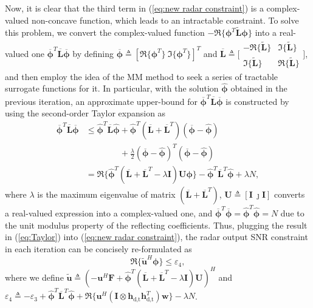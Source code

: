 \documentclass[Conference,a4paper]{IEEEtran}
\newcommand{\be}{\begin{equation}}
\newcommand{\ee}{\end{equation}}
\newcommand{\non}{\nonumber}
\begin{document}
Now, it is clear that the third term in (\ref{eq:new radar constraint}) is a complex-valued non-concave function, which leads to an intractable constraint.
To solve this problem, we convert the complex-valued function $-\Re\{\bm{\phi}^T\widetilde{\mathbf{L}}\bm{\phi}\}$ into a real-valued one $\overline{\bm{\phi}}^T\overline{\mathbf{L}}\overline{\bm{\phi}}$ by defining $\overline{\bm{\phi}} \triangleq [\Re\{\bm{\phi}^T\}~\Im\{\bm{\phi}^T\}]^T$ and $\overline{\mathbf{L}}\triangleq \bigg[\begin{array}{cc}
-\Re\{\widetilde{\mathbf{L}}\} & \Im\{\widetilde{\mathbf{L}}\} \\
\Im\{\widetilde{\mathbf{L}}\} & \Re\{\widetilde{\mathbf{L}}\}                                                                                    \end{array}\bigg]$, and then employ the idea of the MM method to seek a series of tractable surrogate functions for it.
In particular, with the solution $\widehat{\bm{\phi}}$ obtained in the previous iteration, an approximate upper-bound for $\overline{\bm{\phi}}^T\overline{\mathbf{L}}\overline{\bm{\phi}}$ is constructed by using the second-order Taylor expansion as\setcounter{equation}{22}
\begin{subequations}\label{eq:Taylor}\begin{align}
\overline{\bm{\phi}}^T\overline{\mathbf{L}}\overline{\bm{\phi}}
&\leq \widehat{\bm{\phi}}^T\overline{\mathbf{L}}\widehat{\bm{\phi}} + \widehat{\bm{\phi}}^T(\overline{\mathbf{L}}+\overline{\mathbf{L}}^T)(\overline{\bm{\phi}}-\widehat{\bm{\phi}}) \non \\
&\qquad\qquad + \frac{\lambda}{2}(\overline{\bm{\phi}}-\widehat{\bm{\phi}})^T(\overline{\bm{\phi}}-\widehat{\bm{\phi}})\\
& = \Re\{\widehat{\bm{\phi}}^T(\overline{\mathbf{L}}\!+\!\overline{\mathbf{L}}^T\!-\!\lambda\mathbf{I})\mathbf{U}\bm{\phi}\} -\widehat{\bm{\phi}}^T\overline{\mathbf{L}}^T\widehat{\bm{\phi}} + \lambda N,
\end{align}\end{subequations}
where $\lambda$ is the maximum eigenvalue of matrix $(\overline{\mathbf{L}}+\overline{\mathbf{L}}^T)$, $\mathbf{U}\triangleq[\mathbf{I}~\jmath\mathbf{I}]$ converts a real-valued expression into a complex-valued one, and $\overline{\bm{\phi}}^T\overline{\bm{\phi}} = \widehat{\bm{\phi}}^T\widehat{\bm{\phi}} = N$ due to the unit modulus property of the reflecting coefficients.
Thus, plugging the result in (\ref{eq:Taylor}) into (\ref{eq:new radar constraint}), the radar output SNR constraint in each iteration can be concisely re-formulated as
\be\label{eq:radar constraint for phi}
\Re\{\widetilde{\mathbf{u}}^H\bm{\phi}\}\leq \varepsilon_4,
\ee
where we define $\widetilde{\mathbf{u}} \triangleq (-\mathbf{u}^H\mathbf{F} +\widehat{\bm{\phi}}^T(\overline{\mathbf{L}}+\overline{\mathbf{L}}^T\!-\!\lambda\mathbf{I})\mathbf{U})^H$ and $\varepsilon_4 \triangleq  -\varepsilon_3 + \widehat{\bm{\phi}}^T\overline{\mathbf{L}}^T\widehat{\bm{\phi}} + \Re\{ \mathbf{u}^H(\mathbf{I}\otimes\mathbf{h}_{\text{d},\text{t}}\mathbf{h}_{\text{d},\text{t}}^T)\mathbf{w}\}-\lambda N$.
\end{document}
